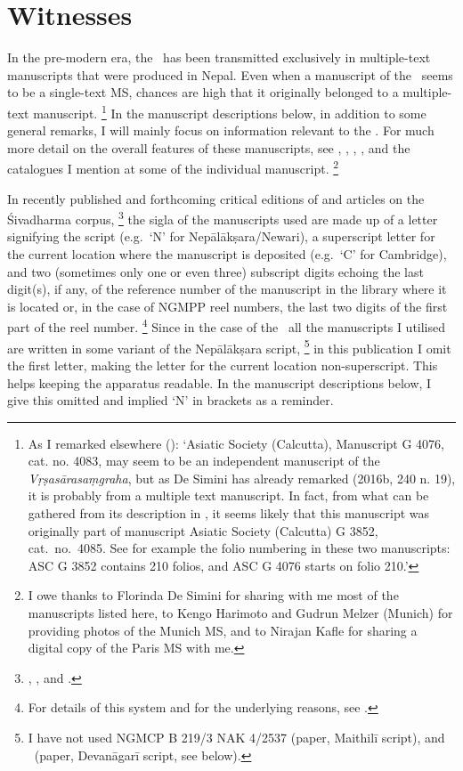 \section{Witnesses}


\noindent
In the pre-modern era, the \VSS\ has been transmitted exclusively in multiple-text manuscripts that were produced in Nepal. Even when a
manuscript of the \VSS\ seems to be a single-text MS, 
chances are high that it originally belonged to a multiple-text
manuscript.%
	\footnote{\label{noteonKolkataMs}As I remarked elsewhere 
	():
	`Asiatic Society (Calcutta), Manuscript G 4076, cat. no. 4083, 
	may seem to be an independent manuscript of the 
	\textit{Vṛṣasārasaṃgraha}, but as De Simini has already 
	remarked (2016b, 240 n. 19),  %
	it is probably from a multiple text manuscript. In fact, from what
	can be gathered from its description in
	,
	it seems likely that this manuscript was
	originally part of manuscript Asiatic Society (Calcutta) G 3852, cat.\
	no.\ 4085. See for example the folio numbering in these two 
	manuscripts: ASC G 3852 contains 210 folios, 
	and ASC G 4076 starts on folio 210.'}
In the manuscript descriptions below, in addition to some general
remarks, I will mainly focus on information relevant to the \VSS. For
much more detail on the overall features of these manuscripts, see 
\mycite{DeSiminiMSSFromNepal2016}, \mycite{BisschopUniversal}, 
, ,  
and the catalogues I mention
at some of the individual manuscript.%
		\footnote{I owe thanks to Florinda De Simini for 
			sharing with me most of the manuscripts listed here, to
  			Kengo Harimoto and Gudrun Melzer (Munich) for 
  			providing photos of the  Munich MS, and to 
  			Nirajan Kafle for sharing a digital 
  			copy of the Paris MS with me.}

In recently published and forthcoming critical editions of and articles
on the Śivadharma corpus,%
		 \footnote{, 
						, and .}
the sigla of the manuscripts used are made up of 
a letter signifying the script (e.g.~`N' for
Nepālākṣara/Newari), a superscript letter for the current location where
the manuscript is deposited (e.g.~`C' for Cambridge), 
and two (sometimes only one or even three) subscript 
digits echoing the last digit(s), if any, of the reference 
number of the manuscript in the 
library where it is located or, in the case of NGMPP reel 
numbers, the last two digits of the first part of the reel number.%
			\footnote{For details of this system and for the underlying reasons, see 
								.}
Since in the case of the \VSS\ all the 
manuscripts I utilised are written in
some variant of the Nepālākṣara script,%
		\footnote{I have not used NGMCP B 219/3 
		NAK 4/2537 (paper, Maithilī script), and \msL\
		(paper, Devanāgarī script, see below).} 
in this publication I omit the first letter, 
making the letter for the current location non-superscript. 
This helps keeping the apparatus readable. 
In the manuscript descriptions below, I give this 
omitted and implied `N' in brackets as a reminder.

